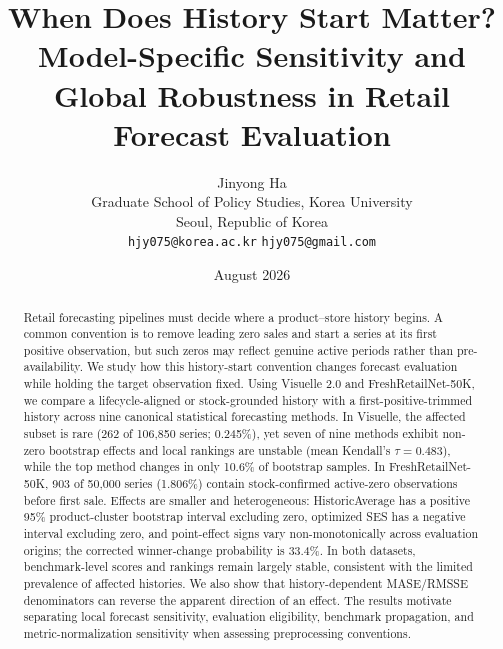 \documentclass[11pt]{article}
\title{When Does History Start Matter?\\
Model-Specific Sensitivity and Global Robustness in Retail Forecast Evaluation}
\author{Jinyong Ha\\
Graduate School of Policy Studies, Korea University\\
Seoul, Republic of Korea\\
\texttt{hjy075@korea.ac.kr} \quad \texttt{hjy075@gmail.com}}
\date{August 2026}
\begin{document}
\maketitle

\begin{abstract}
Retail forecasting pipelines must decide where a product--store history begins. A common convention is to remove leading zero sales and start a series at its first positive observation, but such zeros may reflect genuine active periods rather than pre-availability. We study how this history-start convention changes forecast evaluation while holding the target observation fixed. Using Visuelle 2.0 and FreshRetailNet-50K, we compare a lifecycle-aligned or stock-grounded history with a first-positive-trimmed history across nine canonical statistical forecasting methods. In Visuelle, the affected subset is rare (262 of 106,850 series; 0.245\%), yet seven of nine methods exhibit non-zero bootstrap effects and local rankings are unstable (mean Kendall's $\tau=0.483$), while the top method changes in only 10.6\% of bootstrap samples. In FreshRetailNet-50K, 903 of 50,000 series (1.806\%) contain stock-confirmed active-zero observations before first sale. Effects are smaller and heterogeneous: HistoricAverage has a positive 95\% product-cluster bootstrap interval excluding zero, optimized SES has a negative interval excluding zero, and point-effect signs vary non-monotonically across evaluation origins; the corrected winner-change probability is 33.4\%. In both datasets, benchmark-level scores and rankings remain largely stable, consistent with the limited prevalence of affected histories. We also show that history-dependent MASE/RMSSE denominators can reverse the apparent direction of an effect. The results motivate separating local forecast sensitivity, evaluation eligibility, benchmark propagation, and metric-normalization sensitivity when assessing preprocessing conventions.
\end{abstract}







\appendix

\end{document}
